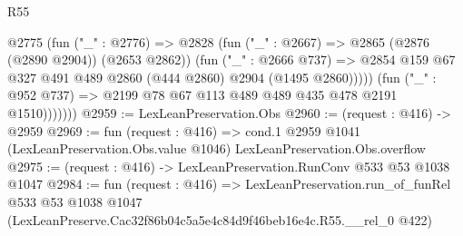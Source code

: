 \begin{lexlean}{R55}
\begin{coremodule}
                  @2775
                    (fun ("_" : @2776) =>
                    @2828
                      (fun ("_" : @2667) => @2865 (@2876 (@2890 @2904)) (@2653 @2862))
                      (fun ("_" : @2666 @737) =>
                      @2854 @159 @67 @327 @491 @489 @2860 (@444 @2860) @2904 (@1495 @2860)))))
                (fun ("_" : @952 @737) => @2199 @78 @67 @113 @489 @489 @435 @478 @2191 @1510)))))))
@2959 := LexLeanPreservation.Obs
@2960 := (request : @416) -> @2959
@2969 := fun (request : @416) =>
  cond.{1} @2959 @1041 (LexLeanPreservation.Obs.value @1046) LexLeanPreservation.Obs.overflow
@2975 := (request : @416) -> LexLeanPreservation.RunConv @533 @53 @1038 @1047
@2984 := fun (request : @416) =>
  LexLeanPreservation.run_of_funRel
    @533
    @53
    @1038
    @1047
    (LexLeanPreserve.Cac32f86b04c5a5e4c84d9f46beb16e4c.R55.__rel_0 @422)
\end{coremodule}
\end{lexlean}
